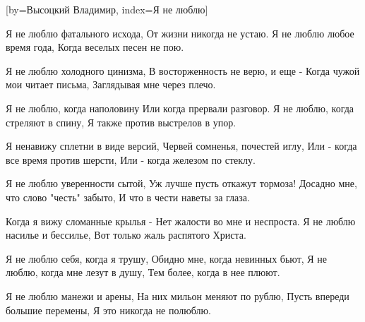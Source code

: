 
[by={Высоцкий Владимир},
                     index={Я не люблю}]
\beginverse

Я не люблю фатального исхода,
От жизни никогда не устаю.
Я не люблю любое время года,
Когда веселых песен не пою.

\endverse
\beginverse

Я не люблю холодного цинизма,
В восторженность не верю, и еще -
Когда чужой мои читает письма,
Заглядывая мне через плечо.

\endverse
\beginverse

Я не люблю, когда наполовину
Или когда прервали разговор.
Я не люблю, когда стреляют в спину,
Я также против выстрелов в упор.

\endverse
\beginverse

Я ненавижу сплетни в виде версий,
Червей сомненья, почестей иглу,
Или - когда все время против шерсти,
Или - когда железом по стеклу.

\endverse
\beginverse

Я не люблю уверенности сытой,
Уж лучше пусть откажут тормоза!
Досадно мне, что слово "честь" забыто,
И что в чести наветы за глаза.

\endverse
\beginverse

Когда я вижу сломанные крылья -
Нет жалости во мне и неспроста.
Я не люблю насилье и бессилье,
Вот только жаль распятого Христа.

\endverse
\beginverse

Я не люблю себя, когда я трушу,
Обидно мне, когда невинных бьют,
Я не люблю, когда мне лезут в душу,
Тем более, когда в нее плюют.

\endverse
\beginverse

Я не люблю манежи и арены,
На них мильон меняют по рублю,
Пусть впереди большие перемены,
Я это никогда не полюблю.

\endverse
\endsong